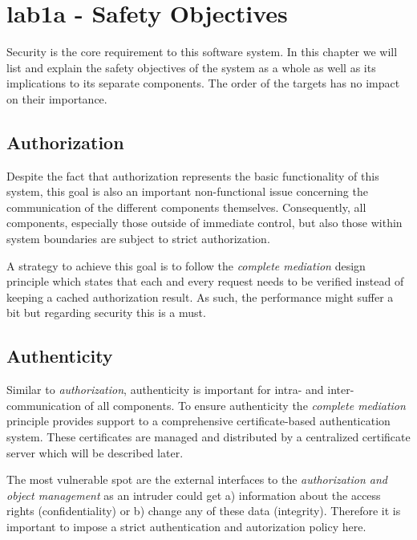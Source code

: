 \documentclass[12pt,a4paper,titlepage,oneside]{scrartcl}
\begin{document}
\maketitle
\setcounter{section}{0}
\setcounter{tocdepth}{2}
\tableofcontents

%
%

\section{lab1a - Safety Objectives}
Security is the core requirement to this software system. In this chapter we will list and explain the
safety objectives of the system as a whole as well as its implications to its separate components. The order
of the targets has no impact on their importance.


\subsection{Authorization}
Despite the fact that authorization represents the basic functionality of this system, this goal is also
an important non-functional issue concerning the communication of the different components themselves. Consequently, all components,
especially those outside of immediate control, but also those within system boundaries are subject to strict
authorization.

A strategy to achieve this goal is to follow the \emph{complete mediation} design principle which states that each and
every request needs to be verified instead of keeping a cached authorization result. As such, the performance might suffer
a bit but regarding security this is a must.


\subsection{Authenticity}
Similar to \emph{authorization}, authenticity is important for intra- and inter-communication of all components. To
ensure authenticity the \emph{complete mediation} principle provides support to a comprehensive certificate-based authentication
system. These certificates are managed and distributed by a centralized certificate server which will be described later.

The most vulnerable spot are the external interfaces to the \emph{authorization and object management} as an intruder could get
a) information about the access rights (confidentiality) or b) change any of these data (integrity). Therefore it is important to impose
a strict authentication and autorization policy here.
\end{document}
